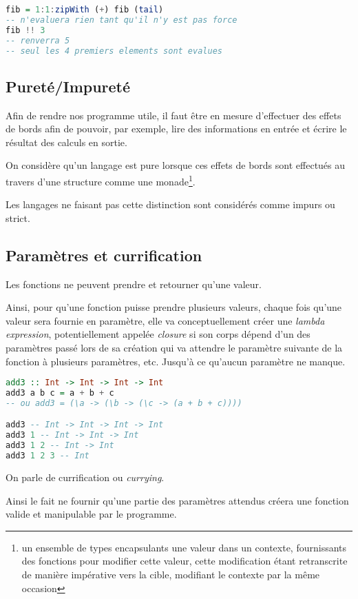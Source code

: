 \documentclass{article}
\begin{document}
\begin{lstlisting}[language=haskell]
fib = 1:1:zipWith (+) fib (tail)
-- n'evaluera rien tant qu'il n'y est pas force
fib !! 3
-- renverra 5
-- seul les 4 premiers elements sont evalues
\end{lstlisting}

\subsection{Pureté/Impureté}
Afin de rendre nos programme utile, il faut être en mesure d'effectuer
des effets de bords afin de pouvoir, par exemple, lire des informations en entrée
et écrire le résultat des calculs en sortie.

On considère qu'un langage est pure lorsque ces effets de bords sont effectués au
travers d'une structure comme une monade\footnote{un ensemble de types
encapsulants une valeur dans un contexte, fournissants des fonctions pour
modifier cette valeur, cette modification étant retranscrite de manière
impérative vers la cible, modifiant le contexte par la même occasion}.

Les langages ne faisant pas cette distinction sont considérés comme impurs ou strict.

\subsection{Paramètres et currification}
Les fonctions ne peuvent prendre et retourner qu'une valeur.

Ainsi, pour qu'une fonction puisse prendre plusieurs valeurs, chaque fois qu'une
valeur sera fournie en paramètre, elle va conceptuellement créer une \emph{lambda expression},
potentiellement appelée \emph{closure} si son corps dépend d'un des paramètres
passé lors de sa création qui va attendre le paramètre suivante de la fonction à
plusieurs paramètres, etc.
Jusqu'à ce qu'aucun paramètre ne manque.

\begin{lstlisting}[language=haskell]
add3 :: Int -> Int -> Int -> Int
add3 a b c = a + b + c
-- ou add3 = (\a -> (\b -> (\c -> (a + b + c))))

add3 -- Int -> Int -> Int -> Int
add3 1 -- Int -> Int -> Int
add3 1 2 -- Int -> Int
add3 1 2 3 -- Int
\end{lstlisting}

On parle de currification ou \emph{currying}.

Ainsi le fait ne fournir qu'une partie des paramètres attendus créera une fonction
valide et manipulable par le programme.
\end{document}
